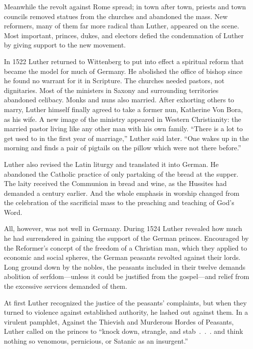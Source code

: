 Meanwhile the revolt against Rome spread; in town after town, priests and town councils removed
statues from the churches and abandoned the mass. New reformers, many of them far more radical than
Luther, appeared on the scene. Most important, princes, dukes, and electors defied the condemnation
of Luther by giving support to the new movement.

In 1522 Luther returned to Wittenberg to put into effect a spiritual reform that became the model
for much of Germany. He abolished the office of bishop since he found no warrant for it in
Scripture. The churches needed pastors, not dignitaries. Most of the ministers in Saxony and
surrounding territories abandoned celibacy. Monks and nuns also married. After exhorting others to
marry, Luther himself finally agreed to take a former nun, Katherine Von Bora, as his wife. A new
image of the ministry appeared in Western Christianity: the married pastor living like any other man
with his own family. “There is a lot to get used to in the first year of marriage,” Luther said
later. “One wakes up in the morning and finds a pair of pigtails on the pillow which were not there
before.”

Luther also revised the Latin liturgy and translated it into German. He abandoned the Catholic
practice of only partaking of the bread at the supper. The laity received the Communion in bread and
wine, as the Hussites had demanded a century earlier. And the whole emphasis in worship changed from
the celebration of the sacrificial mass to the preaching and teaching of God’s Word.

All, however, was not well in Germany. During 1524 Luther revealed how much he had surrendered in
gaining the support of the German princes. Encouraged by the Reformer’s concept of the freedom of a
Christian man, which they applied to economic and social spheres, the German peasants revolted
against their lords. Long ground down by the nobles, the peasants included in their twelve demands
abolition of serfdom—unless it could be justified from the gospel—and relief from the excessive
services demanded of them.

At first Luther recognized the justice of the peasants’ complaints, but when they turned to violence
against established authority, he lashed out against them. In a virulent pamphlet, Against the
Thievish and Murderous Hordes of Peasants, Luther called on the princes to “knock down, strangle,
and stab~.~.~. and think nothing so venomous, pernicious, or Satanic as an insurgent.”

